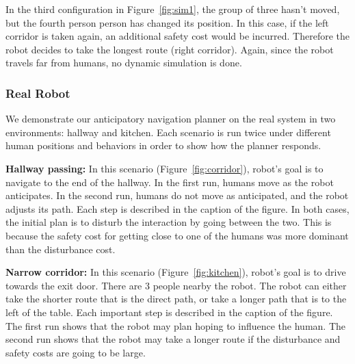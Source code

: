 In the third configuration in Figure~\ref{fig:sim1}, the group of three hasn't moved, but the fourth person person has changed its position. In this case, if the left corridor is taken again, an additional safety cost would be incurred. Therefore the robot decides to take the longest route (right corridor). Again, since the robot travels far from humans, no dynamic simulation is done.

\subsubsection{Real Robot}
\label{sec:navigation_results_real_robot}


We demonstrate our anticipatory navigation planner on the real system in two environments: hallway and kitchen. Each scenario is run twice under different human positions and behaviors in order to show how the planner responds.

\textbf{Hallway passing: } In this scenario (Figure~\ref{fig:corridor}), robot's goal is to navigate to the end of the hallway. In the first run, humans move as the robot anticipates. In the second run, humans do not move as anticipated, and the robot adjusts its path. Each step is described in the caption of the figure. In both cases, the initial plan is to disturb the interaction by going between the two. This is because the safety cost for getting close to one of the humans was more dominant than the disturbance cost.

\textbf{Narrow corridor:} In this scenario (Figure~\ref{fig:kitchen}), robot's goal is to drive towards the exit door. There are 3 people nearby the robot. The robot can either take the shorter route that is the direct path, or take a longer path that is to the left of the table. Each important step is described in the caption of the figure. The first run shows that the robot may plan hoping to influence the human. The second run shows that the robot may take a longer route if the disturbance and safety costs are going to be large.

